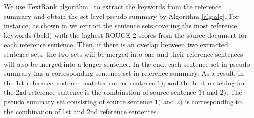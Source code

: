We use TextRank algorithm~\cite{TextRank04}
to extract the keywords from the reference summary
and obtain the set-level pseudo summary by Algorithm \ref{alg:alg}.
For instance, 
as shown in  
we extract the sentence sets covering the most reference keywords (bold) with the highest ROUGE-2 scores
from the source document for each reference sentence. 
Then, if there is 
an overlap between two extracted sentence sets, the two sets will be merged 
into one and their reference sentences will also be merged into 
a longer sentence. In the end, each sentence set in pseudo summary 
has a corresponding sentence set in reference summary. 
As a result, in  the 1st reference sentence matches source sentence $1)$,
and the best matching for the 2nd reference sentence is the combination of source sentence $1)$ and $2)$. 
The pseudo summary set consisting of source sentence $1)$ and $2)$
is corresponding to the combination of 1st and 2nd reference sentences. 

